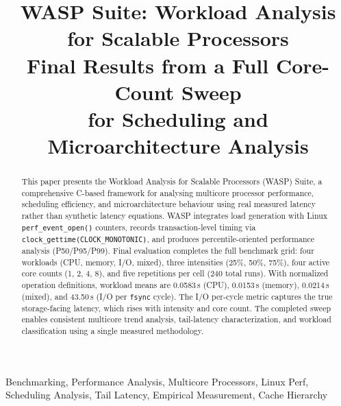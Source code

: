 \documentclass[conference]{IEEEtran}
\begin{document}
\title{WASP Suite: Workload Analysis for Scalable Processors\\
Final Results from a Full Core-Count Sweep\\
for Scheduling and Microarchitecture Analysis}

\author{
\and {}
}

\maketitle

\begin{abstract}
This paper presents the Workload Analysis for Scalable Processors (WASP)
Suite, a comprehensive C-based framework for analysing multicore processor
performance, scheduling efficiency, and microarchitecture behaviour using real
measured latency rather than synthetic latency equations.  WASP integrates
load generation with Linux \texttt{perf\_event\_open()} counters, records
transaction-level timing via \texttt{clock\_gettime(CLOCK\_MONOTONIC)}, and
produces percentile-oriented performance analysis (P50/P95/P99).
Final evaluation completes the full benchmark grid: four workloads
(CPU, memory, I/O, mixed), three intensities (25\%, 50\%, 75\%), four active
core counts (1, 2, 4, 8), and five repetitions per cell (240 total runs).
With normalized operation definitions, workload means are 0.0583\,\textmu{}s
(CPU), 0.0153\,\textmu{}s (memory), 0.0214\,\textmu{}s (mixed), and
43.50\,\textmu{}s (I/O per \texttt{fsync} cycle).  The I/O per-cycle metric
captures the true storage-facing latency, which rises with intensity and core
count.  The completed sweep enables consistent multicore trend analysis,
tail-latency characterization, and workload classification using a single
measured methodology.
\end{abstract}

\begin{IEEEkeywords}
Benchmarking, Performance Analysis, Multicore Processors, Linux Perf,
Scheduling Analysis, Tail Latency, Empirical Measurement, Cache Hierarchy
\end{IEEEkeywords}
\end{document}
